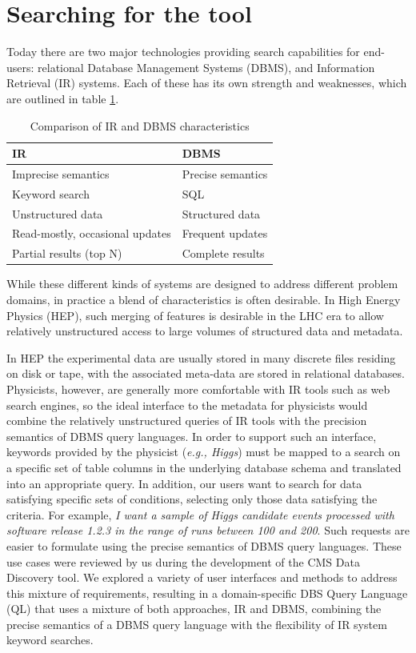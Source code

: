 \documentclass[a4paper]{jpconf}
\begin{document}
\section{Searching for the tool}

Today there are two major technologies providing search capabilities
for end-users: relational Database Management Systems (DBMS), and Information Retrieval (IR) systems.
Each of these has its own strength and weaknesses, which
are outlined in table \ref{IR_DBMS}.

\begin{table}[hbt]
\centering
\begin{tabular}{ll}\hline
\hline

IR & DBMS \\
\hline
Imprecise semantics & Precise semantics \\
Keyword search & SQL \\
Unstructured data & Structured data \\
Read-mostly, occasional updates & Frequent updates \\
Partial results (top N) & Complete results \\
\hline
\hline
\end{tabular}
\caption{Comparison of IR and DBMS characteristics}
\label{IR_DBMS}
\end{table}

While these different kinds of systems are designed to address different problem domains,
in practice a blend of characteristics is often desirable. In High Energy Physics (HEP),
such merging of features is desirable in the LHC era to allow relatively unstructured
access to large volumes of structured data and metadata.

In HEP the experimental data are usually stored in many discrete files
residing on disk or tape, with the associated meta-data are stored in relational databases.
Physicists, however, are generally more comfortable with IR tools such as web search
engines, so the ideal interface to the metadata for physicists would combine the
relatively unstructured queries of IR tools with the precision semantics of DBMS query
languages.  In order to support such an interface, keywords provided by the physicist
({\it e.g., Higgs}) must be mapped to a search on a specific set of
table columns in the underlying database schema and translated into an appropriate query.
In addition, our users want
to search for data satisfying specific sets of conditions, selecting only those
data satisfying the criteria. For example, 
{\it I want a sample of Higgs candidate events processed with software release
1.2.3 in the range of runs between 100 and 200}.  Such requests are
easier to formulate using the precise semantics of DBMS query languages.
These use cases were reviewed by us\cite{DBS07}
during the development of the CMS Data Discovery tool. We explored
a variety of user interfaces and methods to address this mixture of requirements, resulting
in a domain-specific DBS Query Language (QL) that uses a mixture
of both approaches, IR and DBMS, combining the precise
semantics of a DBMS query language with the flexibility of
IR system keyword searches.
\end{document}

